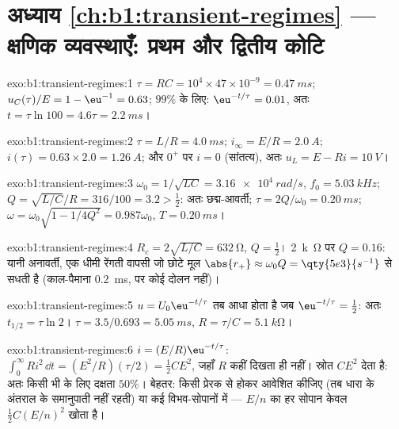 \section*{अध्याय \ref{ch:b1:transient-regimes} --- क्षणिक व्यवस्थाएँ: प्रथम और द्वितीय कोटि}

\begin{solution}{exo:b1:transient-regimes:1}
$\tau = RC = 10^4 \times 47\times10^{-9} = \qty{0.47}{ms}$; $u_C(\tau)/E
= 1 - \eu^{-1} = 0.63$; $99\%$ के लिए: $\eu^{-t/\tau} = 0.01$, अतः $t = \tau\ln 100
= 4.6\tau = \qty{2.2}{ms}$।
\end{solution}

\begin{solution}{exo:b1:transient-regimes:2}
$\tau = L/R = \qty{4.0}{ms}$; $i_\infty = E/R = \qty{2.0}{A}$; $i(\tau) =
0.63 \times 2.0 = \qty{1.26}{A}$; और $0^+$ पर $i = 0$ (सांतत्य), अतः
$u_L = E - Ri = \qty{10}{V}$।
\end{solution}

\begin{solution}{exo:b1:transient-regimes:3}
$\omega_0 = 1/\sqrt{LC} = \qty{3.16e4}{rad/s}$, $f_0 = \qty{5.03}{kHz}$;
$Q = \sqrt{L/C}/R = 316/100 = 3.2 > \tfrac12$: अतः छद्म-आवर्ती;
$\tau = 2Q/\omega_0 = \qty{0.20}{ms}$; $\omega = \omega_0\sqrt{1 - 1/4Q^2}
= 0.987\omega_0$, $T = \qty{0.20}{ms}$।
\end{solution}

\begin{solution}{exo:b1:transient-regimes:4}
$R_c = 2\sqrt{L/C} = \qty{632}{\ohm}$, $Q = \tfrac12$। \qty{2}{k\ohm} पर
$Q = 0.16$: यानी अनावर्ती, एक धीमी रेंगती वापसी जो छोटे मूल
$\abs{r_+} \approx \omega_0 Q = \qty{5e3}{s^{-1}}$ से सधती है (काल-पैमाना
\qty{0.2}{ms}, पर कोई दोलन नहीं)।
\end{solution}

\begin{solution}{exo:b1:transient-regimes:5}
$u = U_0\eu^{-t/\tau}$ तब आधा होता है जब $\eu^{-t/\tau} = \tfrac12$: अतः $t_{1/2}
= \tau\ln 2$। $\tau = 3.5/0.693 = \qty{5.05}{ms}$, $R = \tau/C =
\qty{5.1}{k\ohm}$।
\end{solution}

\begin{solution}{exo:b1:transient-regimes:6}
$i = (E/R)\eu^{-t/\tau}$: $\int_0^\infty Ri^2\,\dd t = (E^2/R)(\tau/2) =
\tfrac12 CE^2$, जहाँ $R$ कहीं दिखता ही नहीं। स्रोत $CE^2$ देता है: अतः किसी भी
 के लिए दक्षता $50\%$। बेहतर: किसी प्रेरक से होकर आवेशित कीजिए (तब
धारा  के अंतराल के समानुपाती नहीं रहती) या कई विभव-सोपानों में ---
$E/n$ का हर सोपान केवल $\tfrac12 C(E/n)^2$ खोता है।
\end{solution}

